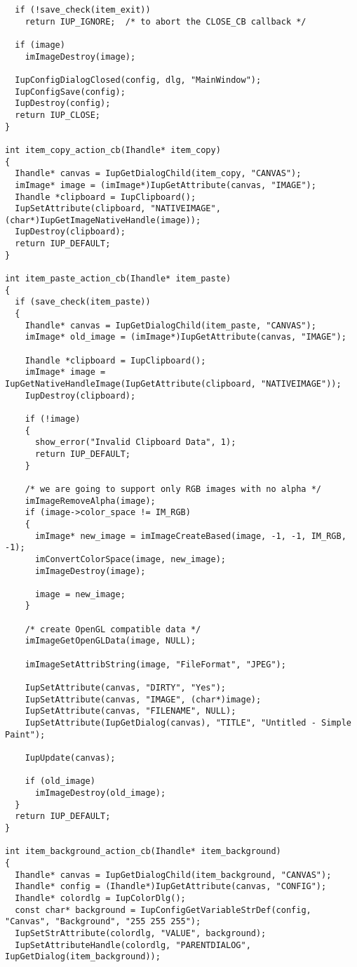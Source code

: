 \documentclass{ctexart}
\begin{document}
\begin{lstlisting}
  if (!save_check(item_exit))
    return IUP_IGNORE;  /* to abort the CLOSE_CB callback */

  if (image)
    imImageDestroy(image);

  IupConfigDialogClosed(config, dlg, "MainWindow");
  IupConfigSave(config);
  IupDestroy(config);
  return IUP_CLOSE;
}

int item_copy_action_cb(Ihandle* item_copy) 
{
  Ihandle* canvas = IupGetDialogChild(item_copy, "CANVAS");
  imImage* image = (imImage*)IupGetAttribute(canvas, "IMAGE");
  Ihandle *clipboard = IupClipboard();
  IupSetAttribute(clipboard, "NATIVEIMAGE", (char*)IupGetImageNativeHandle(image));
  IupDestroy(clipboard);
  return IUP_DEFAULT;
}

int item_paste_action_cb(Ihandle* item_paste) 
{
  if (save_check(item_paste))
  {
    Ihandle* canvas = IupGetDialogChild(item_paste, "CANVAS");
    imImage* old_image = (imImage*)IupGetAttribute(canvas, "IMAGE");

    Ihandle *clipboard = IupClipboard();
    imImage* image = IupGetNativeHandleImage(IupGetAttribute(clipboard, "NATIVEIMAGE"));
    IupDestroy(clipboard);

    if (!image)
    {
      show_error("Invalid Clipboard Data", 1);
      return IUP_DEFAULT;
    }

    /* we are going to support only RGB images with no alpha */
    imImageRemoveAlpha(image);
    if (image->color_space != IM_RGB)
    {
      imImage* new_image = imImageCreateBased(image, -1, -1, IM_RGB, -1);
      imConvertColorSpace(image, new_image);
      imImageDestroy(image);

      image = new_image;
    }

    /* create OpenGL compatible data */
    imImageGetOpenGLData(image, NULL);

    imImageSetAttribString(image, "FileFormat", "JPEG");

    IupSetAttribute(canvas, "DIRTY", "Yes");
    IupSetAttribute(canvas, "IMAGE", (char*)image);
    IupSetAttribute(canvas, "FILENAME", NULL);
    IupSetAttribute(IupGetDialog(canvas), "TITLE", "Untitled - Simple Paint");

    IupUpdate(canvas);

    if (old_image)
      imImageDestroy(old_image);
  }
  return IUP_DEFAULT;
}

int item_background_action_cb(Ihandle* item_background)
{
  Ihandle* canvas = IupGetDialogChild(item_background, "CANVAS");
  Ihandle* config = (Ihandle*)IupGetAttribute(canvas, "CONFIG");
  Ihandle* colordlg = IupColorDlg();
  const char* background = IupConfigGetVariableStrDef(config, "Canvas", "Background", "255 255 255");
  IupSetStrAttribute(colordlg, "VALUE", background);
  IupSetAttributeHandle(colordlg, "PARENTDIALOG", IupGetDialog(item_background));


\end{lstlisting}
\end{document}

